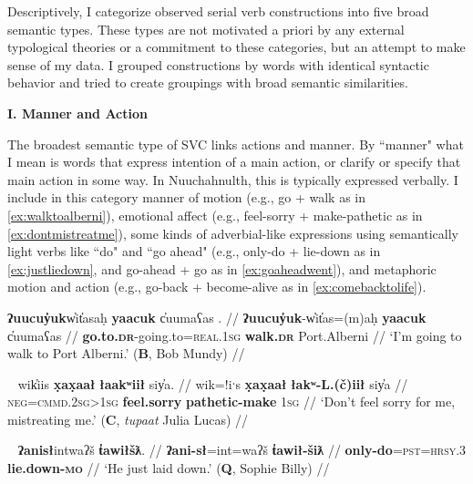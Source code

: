Descriptively, I categorize observed serial verb constructions into five broad semantic types. These types are not motivated a priori by any external typological theories or a commitment to these categories, but an attempt to make sense of my data. I grouped constructions by words with identical syntactic behavior and tried to create groupings with broad semantic similarities.

\vspace{10pt}

\noindent \textbf{I. Manner and Action}

\vspace{10pt}

The broadest semantic type of SVC links actions and manner. By ``manner" what I mean is words that express intention of a main action, or clarify or specify that main action in some way. In Nuuchahnulth, this is typically expressed verbally. I include in this category manner of motion (e.g., go + walk as in \ref{ex:walktoalberni}), emotional affect (e.g., feel-sorry + make-pathetic as in \ref{ex:dontmistreatme}), some kinds of adverbial-like expressions using semantically light verbs like ``do" and ``go ahead" (e.g., only-do + lie-down as in \ref{ex:justliedown}, and go-ahead + go as in \ref{ex:goaheadwent}), and metaphoric motion and action (e.g., go-back + become-alive as in \ref{ex:comebacktolife}).

\ex \label{ex:walktoalberni}
\begingl
\glpreamble \textbf{ʔuucuy̓uk}w̓it̓asaḥ \textbf{yaacuk} c̓uumaʕas . //
\gla \textbf{ʔuucuy̓uk}-w̓it̓as=(m)aḥ \textbf{yaacuk} c̓uumaʕas //
\glb \textbf{go.to.\textsc{dr}}-going.to=\textsc{real.1sg} \textbf{walk.\textsc{dr}} Port.Alberni //
\glft `I'm going to walk to Port Alberni.' (\textbf{B}, Bob Mundy) //
\endgl
\xe

\ex~ \label{ex:dontmistreatme}
\begingl
\glpreamble wik̓iis \textbf{x̣ax̣aał} \textbf{łaakʷiił} siy̓a. //
\gla wik=!iˑs \textbf{x̣ax̣aał} \textbf{łakʷ-L.(č)iił} siy̓a //
\glb \textsc{neg}=\textsc{cmmd.2sg>1sg} \textbf{feel.sorry} \textbf{pathetic-make} \textsc{1sg} //
\glft `Don't feel sorry for me, mistreating me.' (\textbf{C}, \textit{tupaat} Julia Lucas) //
\endgl
\xe

\ex~ \label{ex:justliedown}
\begingl
\glpreamble \textbf{ʔanisł}intwaʔš \textbf{t̓awiłšƛ}. //
\gla \textbf{ʔani-sł}=int=waʔš \textbf{t̓awił-šiƛ} //
\glb \textbf{only-do}=\textsc{pst}=\textsc{hrsy.3} \textbf{lie.down-\textsc{mo}} //
\glft `He just laid down.' (\textbf{Q}, Sophie Billy) //
\endgl
\xe

